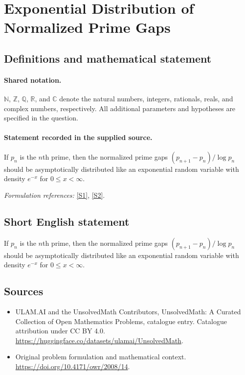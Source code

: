 \documentclass[11pt]{article}
\newcommand{\sref}[2]{\hyperlink{source:#1:#2}{[S#2]}}
\begin{document}
\section{Exponential Distribution of Normalized Prime Gaps}\label{statement}

\subsection{Definitions and mathematical statement}

\paragraph{Shared notation.}$\mathbb N$, $\mathbb Z$, $\mathbb Q$, $\mathbb R$, and $\mathbb C$ denote the natural numbers, integers, rationals, reals, and complex numbers, respectively. All additional parameters and hypotheses are specified in the question.


\paragraph{Statement recorded in the supplied source.}
If $p_n$ is the $n$th prime, then the normalized prime gaps $(p_{n+1}-p_n)/\log p_n$ should be asymptotically distributed like an exponential random variable with density $e^{-x}$ for $0\leq x<\infty$.
\par\smallskip\textit{Formulation references:} \sref{statement}{1}, \sref{statement}{2}.
\subsection{Short English statement}
If $p_n$ is the $n$th prime, then the normalized prime gaps $(p_{n+1}-p_n)/\log p_n$ should be asymptotically distributed like an exponential random variable with density $e^{-x}$ for $0\leq x<\infty$.
\subsection{Sources}
\begin{itemize}
\item[\hypertarget{source:statement:1}{S1}] ULAM.AI and the UnsolvedMath Contributors, UnsolvedMath: A Curated Collection of Open Mathematics Problems, catalogue entry. Catalogue attribution under CC BY 4.0.
\url{https://huggingface.co/datasets/ulamai/UnsolvedMath}.
\item[\hypertarget{source:statement:2}{S2}] Original problem formulation and mathematical context.
\url{https://doi.org/10.4171/owr/2008/14}.
\end{itemize}
\label{end:statement}
\end{document}
